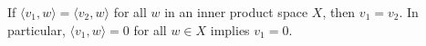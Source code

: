\begin{lemma}[Equality (3.8-2)]\label{(3.8-2)}
   If \( \langle {v}_{1} , w  \rangle = \langle {v}_{2} , w  \rangle  \) for all \( w  \) in an inner product space \( X  \), then \( {v}_{1} = {v}_{2} \). In particular, \( \langle {v}_{1} , w  \rangle = 0  \) for all \( w \in X  \) implies \( {v}_{1} = 0  \). 
\end{lemma}
